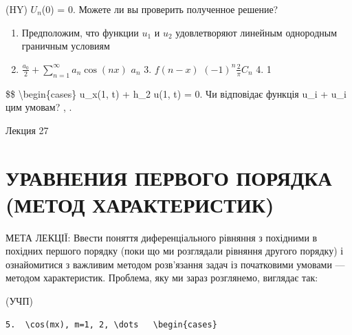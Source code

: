 \documentclass[
  ukrainian,
]{article}
\begin{document}
(HY) \(U_n\)(0) = 0. Можете ли вы проверить полученное решение?

\begin{enumerate}
\def\labelenumi{\arabic{enumi}.}
\setcounter{enumi}{5}
\item
  Предположим, что функции \(u_1\) и \(u_2\) удовлетворяют линейным
  однородным граничным условиям
\item
  \(\frac{a_{0}}{2} + \sum_{n=1}^{\infty} a_{n} \cos(nx)\) \(a_{n}\) 3.
  \(f(n-x)\) \((-1)^{n} \frac{2}{\pi} C_{n}\) 4. 1
\end{enumerate}

\$\$ \textbackslash begin\{cases\} u\_x(1, t) + h\_2 u(1, t) = 0. Чи
відповідає функція u\_i + u\_i цим умовам? , .

Лекция 27

\section{УРАВНЕНИЯ ПЕРВОГО ПОРЯДКА (МЕТОД
ХАРАКТЕРИСТИК)}\label{ux443ux440ux430ux432ux43dux435ux43dux438ux44f-ux43fux435ux440ux432ux43eux433ux43e-ux43fux43eux440ux44fux434ux43aux430-ux43cux435ux442ux43eux434-ux445ux430ux440ux430ux43aux442ux435ux440ux438ux441ux442ux438ux43a}

МЕТА ЛЕКЦІЇ: Ввести поняття диференціального рівняння з похідними в
похідних першого порядку (поки що ми розглядали рівняння другого
порядку) і ознайомитися з важливим методом розв'язання задач із
початковими умовами --- методом характеристик. Проблема, яку ми зараз
розглянемо, виглядає так:

(УЧП)

\begin{verbatim}
5.  \cos(mx), m=1, 2, \dots   \begin{cases}
\end{verbatim}
\end{document}
